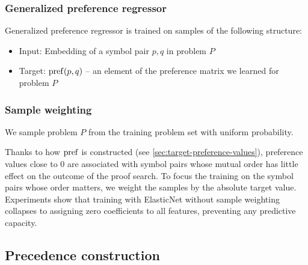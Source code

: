 \subsubsection{Generalized preference regressor}

Generalized preference regressor is trained on samples of the following structure:

\begin{itemize}
	\item Input: Embedding of a symbol pair \(p, q\) in problem \(P\)
	\item Target: \(\operatorname{pref}(p, q)\) -- an element of the preference matrix we learned for problem \(P\)
\end{itemize}

\subsubsection{Sample weighting}

We sample problem \(P\) from the training problem set with uniform probability.

Thanks to how \(\operatorname{pref}\) is constructed (see \autoref{sec:target-preference-values}),
preference values close to 0 are associated with symbol pairs whose mutual order has little effect
on the outcome of the proof search.
To focus the training on the symbol pairs whose order matters,
we weight the samples by the absolute target value.
Experiments show that training with ElasticNet without sample weighting
collapses to assigning zero coefficients to all features,
preventing any predictive capacity.



\subsection{Precedence construction}

